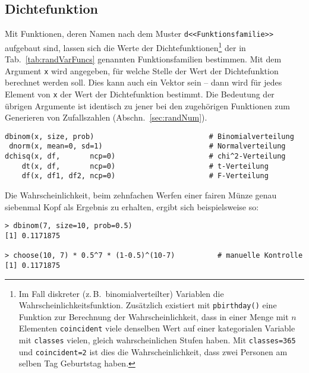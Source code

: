 \subsection{Dichtefunktion}

Mit Funktionen, deren Namen nach dem Muster \lstinline!d<<Funktionsfamilie>>! aufgebaut sind, lassen sich die Werte der Dichtefunktionen\footnote{Im Fall diskreter (z.\,B.\ binomialverteilter) Variablen die Wahrscheinlichkeitsfunktion. Zusätzlich existiert mit \lstinline!pbirthday()! eine Funktion zur Berechnung der Wahrscheinlichkeit, dass in einer Menge mit $n$ Elementen \lstinline!coincident! viele denselben Wert auf einer kategorialen Variable mit \lstinline!classes! vielen, gleich wahrscheinlichen Stufen haben. Mit \lstinline!classes=365! und \lstinline!coincident=2! ist dies die Wahrscheinlichkeit, dass zwei Personen am selben Tag Geburtstag haben.} der in Tab.\ \ref{tab:randVarFuncs} genannten Funktionsfamilien bestimmen. Mit dem Argument \lstinline!x! wird angegeben, für welche Stelle der Wert der Dichtefunktion berechnet werden soll. Dies kann auch ein Vektor sein -- dann wird für jedes Element von \lstinline!x! der Wert der Dichtefunktion bestimmt. Die Bedeutung der übrigen Argumente ist identisch zu jener bei den zugehörigen Funktionen zum Generieren von Zufallszahlen (Abschn.\ \ref{sec:randNum}).
\begin{lstlisting}
dbinom(x, size, prob)                           # Binomialverteilung
 dnorm(x, mean=0, sd=1)                         # Normalverteilung
dchisq(x, df,       ncp=0)                      # chi^2-Verteilung
    dt(x, df,       ncp=0)                      # t-Verteilung
    df(x, df1, df2, ncp=0)                      # F-Verteilung
\end{lstlisting}

Die Wahrscheinlichkeit, beim zehnfachen Werfen einer fairen Münze genau siebenmal Kopf als Ergebnis zu erhalten, ergibt sich beispielsweise so:
\begin{lstlisting}
> dbinom(7, size=10, prob=0.5)
[1] 0.1171875

> choose(10, 7) * 0.5^7 * (1-0.5)^(10-7)          # manuelle Kontrolle
[1] 0.1171875
\end{lstlisting}

